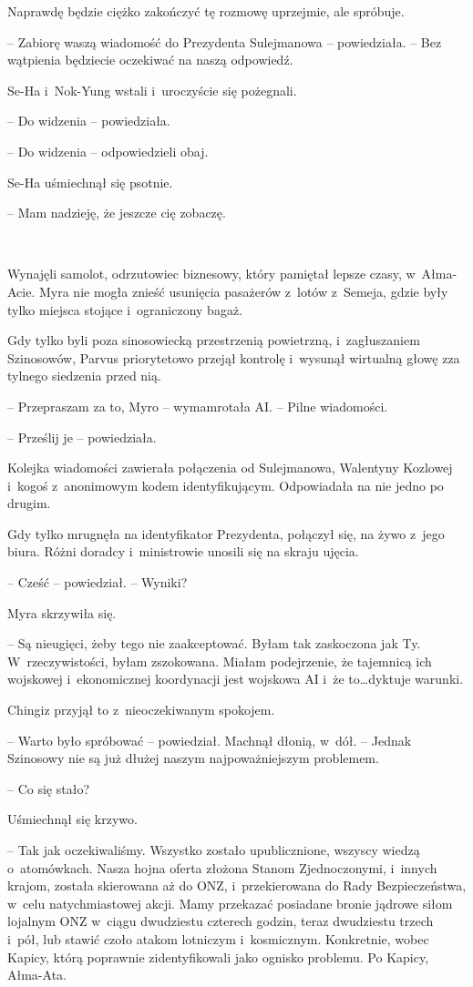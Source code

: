 \documentclass[oneside,polish,11pt,sfheadings]{mwbk}
\begin{document}
Naprawdę będzie ciężko zakończyć tę rozmowę uprzejmie, ale spróbuje.

-- Zabiorę waszą wiadomość do Prezydenta Sulejmanowa -- powiedziała. -- Bez
wątpienia będziecie oczekiwać na naszą odpowiedź.

Se-Ha i~Nok-Yung wstali i~uroczyście się pożegnali.

-- Do widzenia -- powiedziała.

-- Do widzenia -- odpowiedzieli obaj.

Se-Ha uśmiechnął się psotnie. 

-- Mam nadzieję, że jeszcze cię zobaczę.

~

Wynajęli samolot, odrzutowiec biznesowy, który pamiętał lepsze czasy, w~Ałma-Acie. Myra nie mogła znieść usunięcia pasażerów z~lotów z~Semeja,
gdzie były tylko miejsca stojące i~ograniczony bagaż.

Gdy tylko byli poza sinosowiecką przestrzenią powietrzną, i~zagłuszaniem
Szinosowów, Parvus priorytetowo przejął kontrolę i~wysunął wirtualną
głowę zza tylnego siedzenia przed nią.

-- Przepraszam za to, Myro -- wymamrotała AI. -- Pilne wiadomości.

-- Prześlij je -- powiedziała.

Kolejka wiadomości zawierała połączenia od Sulejmanowa, Walentyny
Kozlowej i~kogoś z~anonimowym kodem identyfikującym. Odpowiadała na nie
jedno po drugim.

Gdy tylko mrugnęła na identyfikator Prezydenta, połączył się, na żywo z~jego biura. Różni doradcy i~ministrowie unosili się na skraju ujęcia.

-- Cześć -- powiedział. -- Wyniki?

Myra skrzywiła się. 

-- Są nieugięci, żeby tego nie zaakceptować. Byłam
tak zaskoczona jak Ty. W~rzeczywistości, byłam zszokowana. Miałam
podejrzenie, że tajemnicą ich wojskowej i~ekonomicznej koordynacji jest
wojskowa AI i~że to\ldots dyktuje warunki.

Chingiz przyjął to z~nieoczekiwanym spokojem.

-- Warto było spróbować -- powiedział. Machnął dłonią, w~dół. -- Jednak
Szinosowy nie są już dłużej naszym najpoważniejszym problemem.

-- Co się stało?

Uśmiechnął się krzywo. 

-- Tak jak oczekiwaliśmy. Wszystko zostało
upublicznione, wszyscy wiedzą o~atomówkach. Nasza hojna oferta złożona
Stanom Zjednoczonymi, i~innych krajom, została skierowana aż do ONZ, i~przekierowana do Rady Bezpieczeństwa, w~celu natychmiastowej akcji. Mamy
przekazać posiadane bronie jądrowe siłom lojalnym ONZ w~ciągu dwudziestu
czterech godzin, teraz dwudziestu trzech i~pół, lub stawić czoło atakom
lotniczym i~kosmicznym. Konkretnie, wobec Kapicy, którą poprawnie
zidentyfikowali jako ognisko problemu. Po Kapicy, Ałma-Ata.
\end{document}
